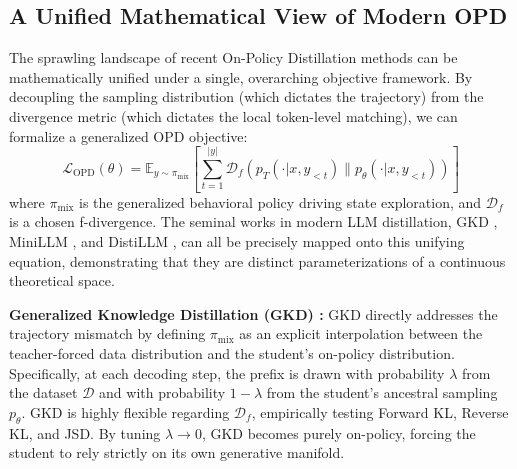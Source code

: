 \documentclass{article} %
\newcommand{\ptheta}{p_\theta}
\newcommand{\pteacher}{p_T}
\newcommand{\loss}{\mathcal{L}}
\begin{document}
\subsection{A Unified Mathematical View of Modern OPD}
\label{subsec:unified_view}

The sprawling landscape of recent On-Policy Distillation methods can be mathematically unified under a single, overarching objective framework. By decoupling the sampling distribution (which dictates the trajectory) from the divergence metric (which dictates the local token-level matching), we can formalize a generalized OPD objective:
\begin{equation}
    \loss_{\mathrm{OPD}}(\theta) = \mathbb{E}_{y \sim \pi_{\mathrm{mix}}} \left[ \sum_{t=1}^{|y|} \mathcal{D}_f \left( \pteacher(\cdot | x, y_{<t}) \parallel \ptheta(\cdot | x, y_{<t}) \right) \right]
\end{equation}
where $\pi_{\mathrm{mix}}$ is the generalized behavioral policy driving state exploration, and $\mathcal{D}_f$ is a chosen f-divergence. The seminal works in modern LLM distillation, GKD \citep{2306.13649}, MiniLLM \citep{2306.08543}, and DistiLLM \citep{2402.03898}, can all be precisely mapped onto this unifying equation, demonstrating that they are distinct parameterizations of a continuous theoretical space.

\textbf{Generalized Knowledge Distillation (GKD) \citep{2306.13649}:} GKD directly addresses the trajectory mismatch by defining $\pi_{\mathrm{mix}}$ as an explicit interpolation between the teacher-forced data distribution and the student's on-policy distribution. Specifically, at each decoding step, the prefix is drawn with probability $\lambda$ from the dataset $\mathcal{D}$ and with probability $1-\lambda$ from the student's ancestral sampling $\ptheta$. GKD is highly flexible regarding $\mathcal{D}_f$, empirically testing Forward KL, Reverse KL, and JSD. By tuning $\lambda \to 0$, GKD becomes purely on-policy, forcing the student to rely strictly on its own generative manifold.
\end{document}

